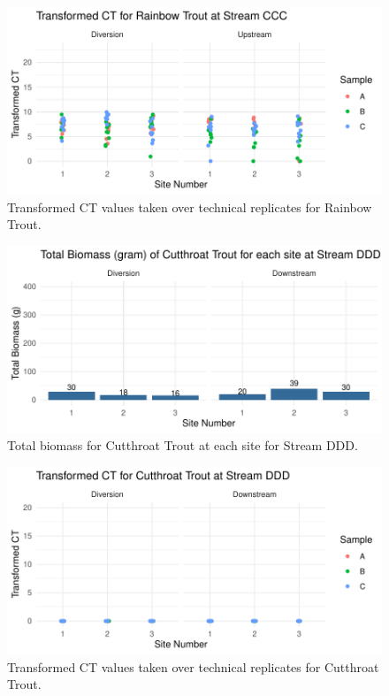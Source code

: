 \begin{figure}[H]
\centering
\includegraphics{AppendixImages/CCC_rb_tct.pdf}
\caption{  \hspace{1mm}   Transformed CT values taken over technical replicates for Rainbow Trout.}
\label{fig:CCC_rb}
\end{figure}



\begin{figure}[H]
\centering
\includegraphics{AppendixImages/DDD_Ct_new.pdf}
\caption{ \hspace{1mm}    Total biomass for Cutthroat Trout at each site for Stream DDD.}
\label{fig:testDDDCt}
\end{figure}



\begin{figure}[H]
\centering
\includegraphics{AppendixImages/DDD_ct_tct.pdf}
\caption{  \hspace{3mm}   Transformed CT values taken over technical replicates for Cutthroat Trout.}
\label{fig:DDD_ct}
\end{figure}



